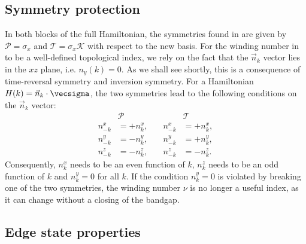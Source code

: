 \subsection{Symmetry protection}
In both blocks of the full Hamiltonian, the symmetries found in  are given by $\mathcal{P} = \sigma_x$ and $\mathcal{T}=\sigma_x \mathcal{K}$ with respect to the new basis.
For the winding number in  to be a well-defined topological index, we rely on the fact that the $\vec{n}_k$ vector lies in the $xz$ plane, i.e. $n_y(k)=0$. As we shall see shortly, this is a consequence of time-reversal symmetry and inversion symmetry.
For a Hamiltonian $H(k) = \vec{n}_k \cdot \vecsigma$, the two symmetries lead to the following conditions on the $\vec{n}_k$ vector:
\begin{align}
    &\mathcal{P}       &\quad         &\mathcal{T} \\
    n^x_{-k} &= +n^x_k, &\quad n^x_{-k} &= +n^x_k, \\
    n^y_{-k} &= -n^y_k, &\quad n^y_{-k} &= +n^y_k, \\
    n^z_{-k} &= -n^z_k, &\quad n^z_{-k} &= -n^z_k.
\end{align}
Consequently, $n^x_k$ needs to be an even function of $k$, $n^z_k$ needs to be an odd function of $k$ and $n^y_k = 0$ for all $k$.
If the condition $n^y_k = 0$ is violated by breaking one of the two symmetries, the winding number $\nu$ is no longer a useful index, as it can change without a closing of the bandgap.

\subsection{Edge state properties}


